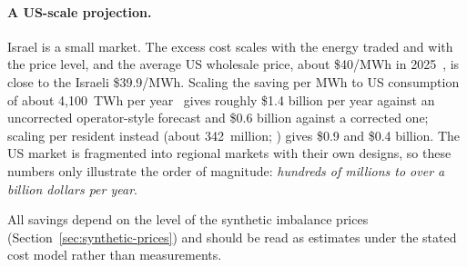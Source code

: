 \paragraph*{A US-scale projection.}  Israel is a small market.  The excess
cost scales with the energy traded and with the price level, and the average
US wholesale price, about \$40/MWh in 2025~\parencite{eia_wholesale2025}, is
close to the Israeli \$39.9/MWh.  Scaling the saving per MWh to US consumption
of about 4{,}100~TWh per year~\parencite{eia_steo} gives roughly \$1.4 billion
per year against an uncorrected operator-style forecast and \$0.6 billion
against a corrected one; scaling per resident instead (about 342~million; \cite{census_vintage2025})
gives \$0.9 and \$0.4 billion.  The US market is fragmented into regional
markets with their own designs, so these numbers only illustrate the order
of magnitude: \emph{hundreds of millions to over a billion dollars per year}.

All savings depend on the level of the synthetic imbalance prices
(Section~\ref{sec:synthetic-prices}) and should be read as estimates under
the stated cost model rather than measurements.
